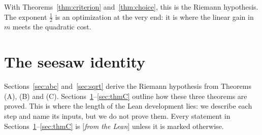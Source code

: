 \documentclass[11pt]{amsart}
\numberwithin{equation}{section}
\theoremstyle{definition}
\theoremstyle{remark}
\newcommand{\status}[1]{\textup{[\emph{#1}]}}
\begin{document}
With Theorems~\ref{thm:criterion} and~\ref{thm:choice}, this is the Riemann hypothesis. The exponent $\frac12$ is an optimization at the very end: it is where the linear gain in $m$ meets the quadratic cost.

\section{The seesaw identity}\label{sec:seesaw}

Sections~\ref{sec:abc} and~\ref{sec:sqrt} derive the Riemann hypothesis from Theorems (A), (B) and (C). Sections~\ref{sec:seesaw}--\ref{sec:thmC} outline how these three theorems are proved. This is where the length of the Lean development lies: we describe each step and name its inputs, but we do not prove them. Every statement in Sections~\ref{sec:seesaw}--\ref{sec:thmC} is \status{from the Lean} unless it is marked otherwise.
\end{document}
